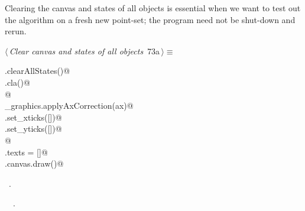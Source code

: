 \documentclass[11.5pt]{report}
\begin{document}

\vspace{-0.8cm}\newchunk Clearing the canvas and states of all objects is essential when we want to test out the algorithm on a fresh
new point-set; the program need not be shut-down and rerun. 
\begin{flushleft} \small\label{scrap107}\raggedright\small
{} $\langle\,${\itshape Clear canvas and states of all objects}\nobreak\ {\footnotesize {73a}}$\,\rangle\equiv$
\vspace{-1ex}
\begin{list}{}{} \item
\mbox{}\verb@run.clearAllStates()@\\
\mbox{}\verb@ax.cla()@\\
\mbox{}\verb@              @\\
\mbox{}\verb@utils_graphics.applyAxCorrection(ax)@\\
\mbox{}\verb@ax.set_xticks([])@\\
\mbox{}\verb@ax.set_yticks([])@\\
\mbox{}\verb@                 @\\
\mbox{}\verb@fig.texts = []@\\
\mbox{}\verb@fig.canvas.draw()@\\
\mbox{}\verb@@{\NWsep}
\end{list}
\vspace{-1.5ex}
\footnotesize
\begin{list}{}{\setlength{\itemsep}{-\parsep}\setlength{\itemindent}{-\leftmargin}}
\item \NWtxtMacroRefIn\ .
\item \NWtxtIdentsUsed\nobreak\  \verb@clearAllStates@\nobreak\ .
\item{}
\end{list}
\vspace{4ex}
\end{flushleft}
\end{document}
